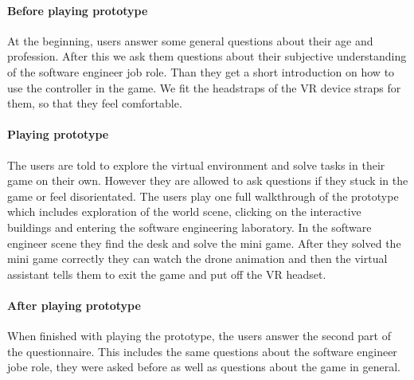 \paragraph{Before playing prototype} At the beginning, users answer some general questions about their age and profession. After this we ask them questions about their subjective understanding of the software engineer job role. Than they get a short introduction on how to use the controller in the game. We fit the headstraps of the VR device straps for them, so that they feel comfortable. 
\paragraph{Playing prototype} The users are told to explore the virtual environment and solve tasks in their game on their own. However they are allowed to ask questions if they stuck in the game or feel disorientated. The users play one full walkthrough of the prototype which includes exploration of the world scene, clicking on the interactive buildings and entering the software engineering laboratory. In the software engineer scene they find the desk and solve the mini game. After they solved the mini game correctly they can watch the drone animation and then the virtual assistant tells them to exit the game and put off the VR headset.
\paragraph{After playing prototype} When finished with playing the prototype, the users answer the second part of the questionnaire. This includes the same questions about the software engineer jobe role, they were asked before as well as questions about the game in general.

